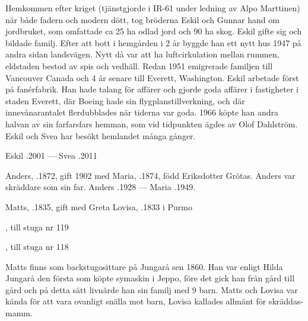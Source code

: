 Hemkommen efter kriget (tjänstgjorde i IR-61 under ledning av Alpo 	Marttinen) när både fadern och modern dött, tog bröderna Eskil och Gunnar hand om jordbruket, som omfattade ca 25 ha odlad jord och 90 ha skog. Eskil gifte sig och bildade familj. Efter att bott i hemgården i 2 år byggde han ett nytt hus 1947 på andra sidan landsvägen. Nytt då var att ha luftcirkulation mellan rummen, eldstaden bestod av spis och vedhäll. Redan 1951 emigrerade familjen till Vancouver 	Canada och 4 år senare till Everett, Washington. Eskil arbetade först på fanérfabrik. Han hade talang för affärer och gjorde goda affärer i fastigheter i staden Everett, där Boeing hade sin flygplanstillverkning, och där innevånarantalet flerdubblades när tiderna var goda. 1966 köpte han andra halvan av sin farfarsfars hemman, som vid tidpunkten ägdes av Olof Dahlström. Eskil och Svea har besökt hemlandet många gånger.

Eskil .2001  ---  Svea .2011



%


%
Anders, .1872, gift 1902 med Maria, .1874, född Eriksdotter Grötas. Anders var skräddare som sin far. Anders .1928  ---   Maria .1949.\jhvspace{}


%
Matts, .1835, gift med Greta Lovisa, .1833 i Purmo
\begin{jhchildren}
  \item {}
  \item {}
  \item {}
  \item {}
  \item {}
  \item {}
  \item {}, till stuga nr 119
  \item {}, till stuga nr 118
  \item {}
\end{jhchildren}
Matts finns som backstugosittare på Jungarå sen 1860. Han var enligt Hilda Jungarå den första som köpte symaskin i Jeppo, före det gick han från gård till gård och på detta sätt livnärde han sin familj med 9 barn. Matts och Lovisa var kända för att vara ovanligt snälla mot barn, Lovisa kallades allmänt för skräddas-mamm.

